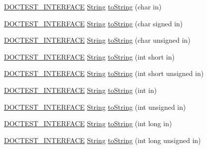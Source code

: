 \begin{DoxyCompactItemize}
\item 
\mbox{\hyperlink{doctest_8h_a9c16ffc635ec47f07797d21ede26b1a5}{D\+O\+C\+T\+E\+S\+T\+\_\+\+I\+N\+T\+E\+R\+F\+A\+CE}} \mbox{\hyperlink{classdoctest_1_1_string}{String}} \mbox{\hyperlink{namespacedoctest_af106dff2a0c068d301349b754c466378}{to\+String}} (char in)
\item 
\mbox{\hyperlink{doctest_8h_a9c16ffc635ec47f07797d21ede26b1a5}{D\+O\+C\+T\+E\+S\+T\+\_\+\+I\+N\+T\+E\+R\+F\+A\+CE}} \mbox{\hyperlink{classdoctest_1_1_string}{String}} \mbox{\hyperlink{namespacedoctest_a1f910fdc13d84a538090b959a97a6fa5}{to\+String}} (char signed in)
\item 
\mbox{\hyperlink{doctest_8h_a9c16ffc635ec47f07797d21ede26b1a5}{D\+O\+C\+T\+E\+S\+T\+\_\+\+I\+N\+T\+E\+R\+F\+A\+CE}} \mbox{\hyperlink{classdoctest_1_1_string}{String}} \mbox{\hyperlink{namespacedoctest_ae2c3e60e3ee32da5d8fc4f778b7a225a}{to\+String}} (char unsigned in)
\item 
\mbox{\hyperlink{doctest_8h_a9c16ffc635ec47f07797d21ede26b1a5}{D\+O\+C\+T\+E\+S\+T\+\_\+\+I\+N\+T\+E\+R\+F\+A\+CE}} \mbox{\hyperlink{classdoctest_1_1_string}{String}} \mbox{\hyperlink{namespacedoctest_aaff61384b81d700818094342c6110d2c}{to\+String}} (int short in)
\item 
\mbox{\hyperlink{doctest_8h_a9c16ffc635ec47f07797d21ede26b1a5}{D\+O\+C\+T\+E\+S\+T\+\_\+\+I\+N\+T\+E\+R\+F\+A\+CE}} \mbox{\hyperlink{classdoctest_1_1_string}{String}} \mbox{\hyperlink{namespacedoctest_a04b10595f3fac969e7682a48fd3ad0c6}{to\+String}} (int short unsigned in)
\item 
\mbox{\hyperlink{doctest_8h_a9c16ffc635ec47f07797d21ede26b1a5}{D\+O\+C\+T\+E\+S\+T\+\_\+\+I\+N\+T\+E\+R\+F\+A\+CE}} \mbox{\hyperlink{classdoctest_1_1_string}{String}} \mbox{\hyperlink{namespacedoctest_a0318ba5a1fbeb9e2fe84227a2f007dac}{to\+String}} (int in)
\item 
\mbox{\hyperlink{doctest_8h_a9c16ffc635ec47f07797d21ede26b1a5}{D\+O\+C\+T\+E\+S\+T\+\_\+\+I\+N\+T\+E\+R\+F\+A\+CE}} \mbox{\hyperlink{classdoctest_1_1_string}{String}} \mbox{\hyperlink{namespacedoctest_a6de63ae787cb530ee050b3632106907d}{to\+String}} (int unsigned in)
\item 
\mbox{\hyperlink{doctest_8h_a9c16ffc635ec47f07797d21ede26b1a5}{D\+O\+C\+T\+E\+S\+T\+\_\+\+I\+N\+T\+E\+R\+F\+A\+CE}} \mbox{\hyperlink{classdoctest_1_1_string}{String}} \mbox{\hyperlink{namespacedoctest_aac941ce13f416e31d72d9fb114681bb2}{to\+String}} (int long in)
\item 
\mbox{\hyperlink{doctest_8h_a9c16ffc635ec47f07797d21ede26b1a5}{D\+O\+C\+T\+E\+S\+T\+\_\+\+I\+N\+T\+E\+R\+F\+A\+CE}} \mbox{\hyperlink{classdoctest_1_1_string}{String}} \mbox{\hyperlink{namespacedoctest_ac1c9dfb0453eb7d222bed9d2a4cf62fd}{to\+String}} (int long unsigned in)

\end{DoxyCompactItemize}
